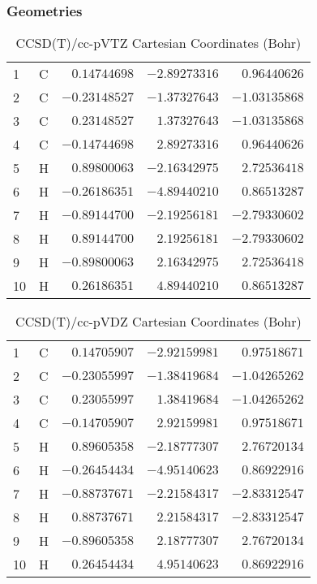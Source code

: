 \documentclass[10pt,oneside]{article}
\begin{document}
\clearpage

\subsection{\ \ \ }

\subsubsection*{Geometries}
\begin{table}[h!]
\centering
\caption{CCSD(T)/cc-pVTZ Cartesian Coordinates (Bohr)}
\begin{tabular}{llrrr}
1  & C  & $ 0.14744698$ & $-2.89273316$ & $ 0.96440626$ \\
2  & C  & $-0.23148527$ & $-1.37327643$ & $-1.03135868$ \\
3  & C  & $ 0.23148527$ & $ 1.37327643$ & $-1.03135868$ \\
4  & C  & $-0.14744698$ & $ 2.89273316$ & $ 0.96440626$ \\
5  & H  & $ 0.89800063$ & $-2.16342975$ & $ 2.72536418$ \\
6  & H  & $-0.26186351$ & $-4.89440210$ & $ 0.86513287$ \\
7  & H  & $-0.89144700$ & $-2.19256181$ & $-2.79330602$ \\
8  & H  & $ 0.89144700$ & $ 2.19256181$ & $-2.79330602$ \\
9  & H  & $-0.89800063$ & $ 2.16342975$ & $ 2.72536418$ \\
10 & H  & $ 0.26186351$ & $ 4.89440210$ & $ 0.86513287$ \\
\end{tabular}
\end{table}

\begin{table}[h!]
\centering
\caption{CCSD(T)/cc-pVDZ Cartesian Coordinates (Bohr)}
\begin{tabular}{llrrr}
1  & C  & $ 0.14705907$ & $-2.92159981$ & $ 0.97518671$ \\
2  & C  & $-0.23055997$ & $-1.38419684$ & $-1.04265262$ \\
3  & C  & $ 0.23055997$ & $ 1.38419684$ & $-1.04265262$ \\
4  & C  & $-0.14705907$ & $ 2.92159981$ & $ 0.97518671$ \\
5  & H  & $ 0.89605358$ & $-2.18777307$ & $ 2.76720134$ \\
6  & H  & $-0.26454434$ & $-4.95140623$ & $ 0.86922916$ \\
7  & H  & $-0.88737671$ & $-2.21584317$ & $-2.83312547$ \\
8  & H  & $ 0.88737671$ & $ 2.21584317$ & $-2.83312547$ \\
9  & H  & $-0.89605358$ & $ 2.18777307$ & $ 2.76720134$ \\
10 & H  & $ 0.26454434$ & $ 4.95140623$ & $ 0.86922916$ \\
\end{tabular}
\end{table}
\end{document}
